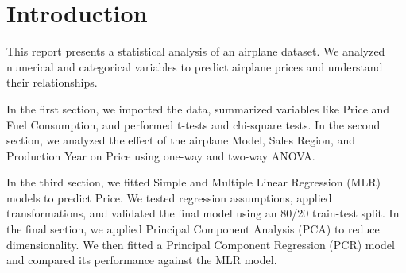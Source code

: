 \newpage
\section*{Introduction}
\label{cha:introduction}

This report presents a statistical analysis of an airplane dataset. We analyzed numerical and categorical variables to predict airplane prices and understand their relationships. 

In the first section, we imported the data, summarized variables like Price and Fuel Consumption, and performed t-tests and chi-square tests. In the second section, we analyzed the effect of the airplane Model, Sales Region, and Production Year on Price using one-way and two-way ANOVA. 

In the third section, we fitted Simple and Multiple Linear Regression (MLR) models to predict Price. We tested regression assumptions, applied transformations, and validated the final model using an 80/20 train-test split. In the final section, we applied Principal Component Analysis (PCA) to reduce dimensionality. We then fitted a Principal Component Regression (PCR) model and compared its performance against the MLR model.
